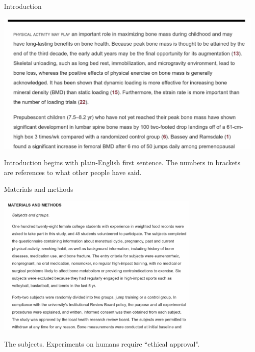 \documentclass[
  ignorenonframetext,
]{beamer}
\begin{document}
\begin{frame}{Introduction}
\protect\hypertarget{introduction-1}{}

\includegraphics[width=\textwidth]{intro}

Introduction begins with plain-English first sentence. The numbers in
brackets are references to what other people have said.

\end{frame}

\begin{frame}{Materials and methods}
\protect\hypertarget{materials-and-methods}{}

\includegraphics[width=0.75\textwidth]{matmeth}

The subjects. Experiments on humans require ``ethical approval''.

\end{frame}
\end{document}
